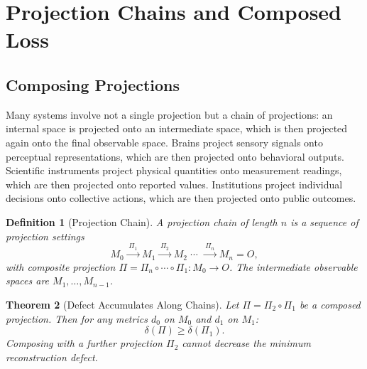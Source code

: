 \documentclass[12pt,a4paper]{article}
\newtheorem{theorem}{Theorem}[section]
\newtheorem{definition}[theorem]{Definition}
\theoremstyle{remark}
\theoremstyle{definition}
\begin{document}

\section{Projection Chains and Composed Loss}

\subsection{Composing Projections}

Many systems involve not a single projection but a chain of projections:
an internal space is projected onto an intermediate space, which is then
projected again onto the final observable space. Brains project sensory
signals onto perceptual representations, which are then projected onto
behavioral outputs. Scientific instruments project physical quantities
onto measurement readings, which are then projected onto reported values.
Institutions project individual decisions onto collective actions, which
are then projected onto public outcomes.

\begin{definition}[Projection Chain]
A \emph{projection chain} of length $n$ is a sequence of projection
settings
\begin{equation}
  M_0 \xrightarrow{\;\Pi_1\;} M_1 \xrightarrow{\;\Pi_2\;} M_2
  \;\cdots\; \xrightarrow{\;\Pi_n\;} M_n = O,
\end{equation}
with composite projection $\Pi = \Pi_n \circ \cdots \circ \Pi_1 :
M_0 \to O$. The \emph{intermediate observable spaces} are
$M_1, \ldots, M_{n-1}$.
\end{definition}

\begin{theorem}[Defect Accumulates Along Chains]
\label{thm:chain_defect}
Let $\Pi = \Pi_2 \circ \Pi_1$ be a composed projection. Then for any
metrics $d_0$ on $M_0$ and $d_1$ on $M_1$:
\begin{equation}
  \delta(\Pi) \geq \delta(\Pi_1).
\end{equation}
Composing with a further projection $\Pi_2$ cannot decrease the minimum
reconstruction defect.
\end{theorem}
\end{document}

